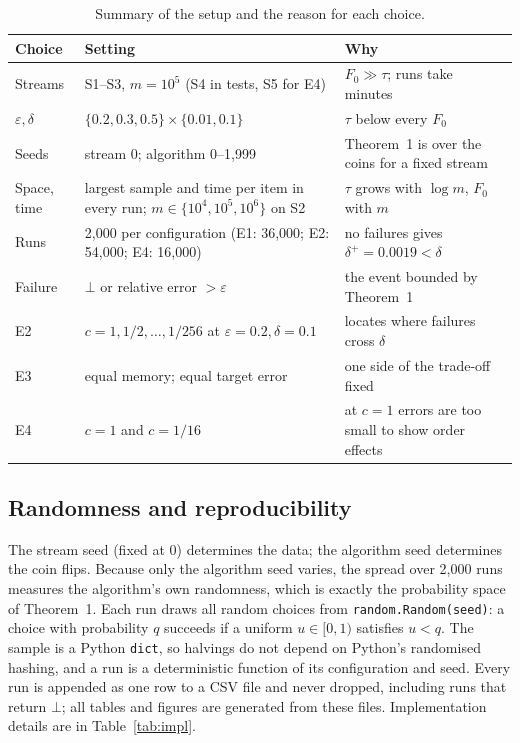 \documentclass[11pt]{article}
\newcommand{\eps}{\varepsilon}
\begin{document}
\begin{table}[htbp]
\centering\small
\caption{Summary of the setup and the reason for each choice.}\label{tab:setup}
\begin{tabularx}{\linewidth}{@{}lLL@{}}
\toprule
Choice & Setting & Why \\
\midrule
Streams & S1--S3, $m = 10^5$ (S4 in tests, S5 for E4) &
  $F_0 \gg \tau$; runs take minutes \\
$\eps, \delta$ & $\{0.2, 0.3, 0.5\} \times \{0.01, 0.1\}$ &
  $\tau$ below every $F_0$ \\
Seeds & stream 0; algorithm 0--1,999 &
  Theorem~1 is over the coins for a fixed stream \\
Space, time & largest sample and time per item in every run;
  $m \in \{10^4, 10^5, 10^6\}$ on S2 & $\tau$ grows with $\log m$, $F_0$ with $m$ \\
Runs & 2,000 per configuration (E1: 36,000; E2: 54,000; E4: 16,000) &
  no failures gives $\delta^+ = 0.0019 < \delta$ \\
Failure & $\bot$ or relative error $> \eps$ & the event bounded by Theorem~1 \\
E2 & $c = 1, 1/2, \dots, 1/256$ at $\eps = 0.2, \delta = 0.1$ &
  locates where failures cross $\delta$ \\
E3 & equal memory; equal target error & one side of the trade-off fixed \\
E4 & $c = 1$ and $c = 1/16$ &
  at $c = 1$ errors are too small to show order effects \\
\bottomrule
\end{tabularx}
\end{table}

\subsection{Randomness and reproducibility}\label{sec:randomness}

The stream seed (fixed at 0) determines the data; the algorithm seed
determines the coin flips. Because only the algorithm seed varies, the spread
over 2,000 runs measures the algorithm's own randomness, which is exactly the
probability space of Theorem~1. Each run draws all random choices from
\texttt{random.Random(seed)}: a choice with probability $q$ succeeds if a
uniform $u \in [0,1)$ satisfies $u < q$. The sample is a Python
\texttt{dict}, so halvings do not depend on Python's randomised hashing, and a
run is a deterministic function of its configuration and seed. Every run is
appended as one row to a CSV file and never dropped, including runs that
return $\bot$; all tables and figures are generated from these files.
Implementation details are in Table~\ref{tab:impl}.
\end{document}
